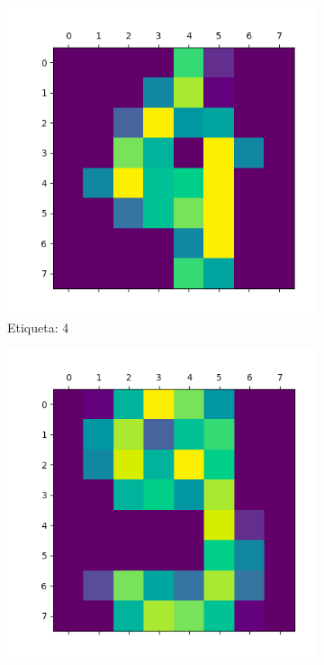 \documentclass{article}
\begin{document}
\begin{figure}[H]
	\begin{subfigure}[b]{0.3\textwidth}
		\centering
		\includegraphics*[scale=0.2]{Images/muestra4.png}
		\caption{Etiqueta: 4}
	\end{subfigure}
	\begin{subfigure}[b]{0.3\textwidth}
		\centering
		\includegraphics*[scale=0.2]{Images/muestra9.png}

\end{subfigure}
\end{figure}
\end{document}
